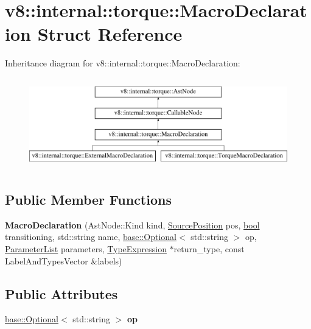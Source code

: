 \hypertarget{structv8_1_1internal_1_1torque_1_1MacroDeclaration}{}\section{v8\+:\+:internal\+:\+:torque\+:\+:Macro\+Declaration Struct Reference}
\label{structv8_1_1internal_1_1torque_1_1MacroDeclaration}
Inheritance diagram for v8\+:\+:internal\+:\+:torque\+:\+:Macro\+Declaration\+:\begin{figure}[H]
\begin{center}
\leavevmode
\includegraphics[height=4.000000cm]{structv8_1_1internal_1_1torque_1_1MacroDeclaration}
\end{center}
\end{figure}
\subsection*{Public Member Functions}
\begin{DoxyCompactItemize}
\item 
\mbox{\label{structv8_1_1internal_1_1torque_1_1MacroDeclaration_a9e7ccf68e32306ceedb91e43c026b160}} 
{\bfseries Macro\+Declaration} (Ast\+Node\+::\+Kind kind, \mbox{\hyperlink{structv8_1_1internal_1_1torque_1_1SourcePosition}{Source\+Position}} pos, \mbox{\hyperlink{classbool}{bool}} transitioning, std\+::string name, \mbox{\hyperlink{classv8_1_1base_1_1Optional}{base\+::\+Optional}}$<$ std\+::string $>$ op, \mbox{\hyperlink{structv8_1_1internal_1_1torque_1_1ParameterList}{Parameter\+List}} parameters, \mbox{\hyperlink{structv8_1_1internal_1_1torque_1_1TypeExpression}{Type\+Expression}} $\ast$return\+\_\+type, const Label\+And\+Types\+Vector \&labels)
\end{DoxyCompactItemize}
\subsection*{Public Attributes}
\begin{DoxyCompactItemize}
\item 
\mbox{\label{structv8_1_1internal_1_1torque_1_1MacroDeclaration_a799ad9ea2c392f2d28d6245215467944}} 
\mbox{\hyperlink{classv8_1_1base_1_1Optional}{base\+::\+Optional}}$<$ std\+::string $>$ {\bfseries op}
\end{DoxyCompactItemize}
